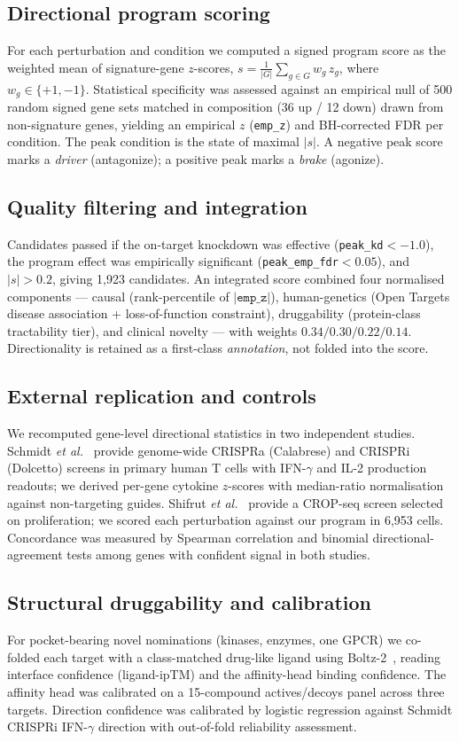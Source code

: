 \documentclass[10pt,twocolumn]{article}
\begin{document}
\subsection{Directional program scoring}
For each perturbation and condition we computed a signed program score as the weighted mean of signature-gene $z$-scores, $s=\frac{1}{|G|}\sum_{g\in G} w_g\, z_g$, where $w_g\in\{+1,-1\}$. Statistical specificity was assessed against an empirical null of 500 random signed gene sets matched in composition (36 up / 12 down) drawn from non-signature genes, yielding an empirical $z$ (\texttt{emp\_z}) and BH-corrected FDR per condition. The peak condition is the state of maximal $|s|$. A negative peak score marks a \emph{driver} (antagonize); a positive peak marks a \emph{brake} (agonize).

\subsection{Quality filtering and integration}
Candidates passed if the on-target knockdown was effective (\texttt{peak\_kd}$<-1.0$), the program effect was empirically significant (\texttt{peak\_emp\_fdr}$<0.05$), and $|s|>0.2$, giving 1{,}923 candidates. An integrated score combined four normalised components --- causal (rank-percentile of $|\texttt{emp\_z}|$), human-genetics (Open Targets disease association + loss-of-function constraint), druggability (protein-class tractability tier), and clinical novelty --- with weights $0.34/0.30/0.22/0.14$. Directionality is retained as a first-class \emph{annotation}, not folded into the score.

\subsection{External replication and controls}
We recomputed gene-level directional statistics in two independent studies. Schmidt \textit{et al.}~\citep{schmidt2022} provide genome-wide CRISPRa (Calabrese) and CRISPRi (Dolcetto) screens in primary human T cells with IFN-$\gamma$ and IL-2 production readouts; we derived per-gene cytokine $z$-scores with median-ratio normalisation against non-targeting guides. Shifrut \textit{et al.}~\citep{shifrut2018} provide a CROP-seq screen selected on proliferation; we scored each perturbation against our program in 6{,}953 cells. Concordance was measured by Spearman correlation and binomial directional-agreement tests among genes with confident signal in both studies.

\subsection{Structural druggability and calibration}
For pocket-bearing novel nominations (kinases, enzymes, one GPCR) we co-folded each target with a class-matched drug-like ligand using Boltz-2~\citep{boltz2}, reading interface confidence (ligand-ipTM) and the affinity-head binding confidence. The affinity head was calibrated on a 15-compound actives/decoys panel across three targets. Direction confidence was calibrated by logistic regression against Schmidt CRISPRi IFN-$\gamma$ direction with out-of-fold reliability assessment.
\end{document}
